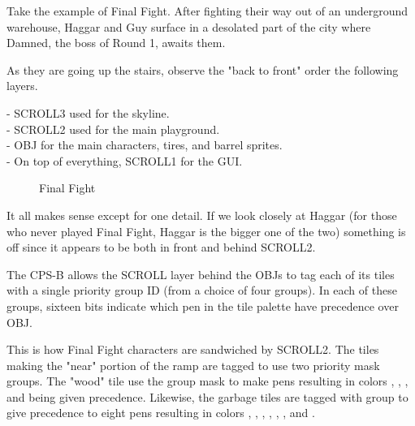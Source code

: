 Take the example of Final Fight. After fighting their way out of an underground warehouse, Haggar and Guy surface in a desolated part of the city where Damned, the boss of Round 1, awaits them.

As they are going up the stairs, observe the "back to front" order the following layers.

-  SCROLL3 used for the skyline.\\
-  SCROLL2 used for the main playground.\\
-  OBJ for the main characters, tires, and barrel sprites.\\
-  On top of everything, SCROLL1 for the GUI.


\vfill
\begin{figure}[!b]
 \caption*{Final Fight}%
 \end{figure}%
\pagebreak


It all makes sense except for one detail. If we look closely at Haggar (for those who never played Final Fight, Haggar is the bigger one of the two) something is off since it appears to be both in front and behind SCROLL2.

The CPS-B allows the SCROLL layer behind the OBJs to tag each of its tiles with a single priority group ID (from a choice of four groups). In each of these groups, sixteen bits indicate which pen in the tile palette have precedence over OBJ.

This is how Final Fight characters are sandwiched by SCROLL2. The tiles making the "near" portion of the ramp are tagged to use two priority mask groups. The "wood" tile use the group mask  to make pens resulting in colors
 , 
 , 
 , and 
 being given precedence. 
Likewise, the garbage tiles are tagged with group  to give precedence to eight pens resulting in colors 
  , 
 , 
 , 
 , 
 ,
 , 
 and  
.

